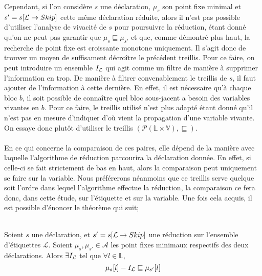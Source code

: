 \documentclass[a4paper, 12pt]{article}
\begin{document}
Cependant, si l'on considère $s$ une déclaration, $\mu_s$ son point fixe minimal et $s' = s[\mathcal{L} \rightarrow{Skip}]$ cette même déclaration
réduite, alors il n'est pas possible d'utiliser l'analyse de vivacité de $s$ pour poursuivre la réduction, étant donné qu'on ne peut pas garantir que
$\mu_{s} \sqsubseteq \mu_{s'}$ et que, comme démontré plus haut, la recherche de point fixe est croissante monotone uniquement. 
Il s'agit donc de trouver un moyen de suffisament décroître le précédent treillis.
Pour ce faire, on peut introduire un ensemble $I_{\mathcal{L}}$ qui agit comme un filtre de manière à supprimer l'information en trop. 
De manière à filtrer convenablement le treillis de $s$, il faut ajouter de l'information à cette dernière. 
En effet, il est nécessaire qu'à chaque bloc $b$, il soit possible de connaître quel bloc sous-jacent
a besoin des variables vivantes en $b$. Pour ce faire, le treillis utilisé n'est plus adapté étant donné qu'il n'est pas en mesure
d'indiquer d'où vient la propagation d'une variable vivante. On essaye donc plutôt d'utiliser le treillis $(\mathcal{P}(\mathbb{L} \times \mathbb{V}), \sqsubseteq)$. 
\\
\\
En ce qui concerne la comparaison de ces paires, elle dépend de la manière avec laquelle l'algorithme de réduction parcourira la déclaration donnée.
En effet, si celle-ci se fait strictement de bas en haut, alors la comparaison peut uniquement se faire sur la variable. Nous préférerons néanmoins
que ce treillis serve quelque soit l'ordre dans lequel l'algorithme effectue la réduction, la comparaison ce fera donc, dans cette étude, sur l'étiquette
et sur la variable. Une fois cela acquis, il est possible d'énoncer le théorème qui suit;
\\
\\
\begin{theorem}
	Soient $s$ une déclaration, et $s' = s[\mathcal{L} \rightarrow{Skip}]$ une réduction sur
	l'ensemble d'étiquettes $\mathcal{L}$. Soient $\mu_s, \mu_{s'} \in \mathcal{A}$ les point fixes minimaux respectifs
	des deux déclarations.
	Alors $\exists I_{\mathcal{L}}$ tel que $\forall l \in \mathbb{L}$,
	\[\mu_s[l] - I_{\mathcal{L}} \sqsubseteq \mu_{s'}[l]\]
\end{theorem}
\\
\\
\end{document}
